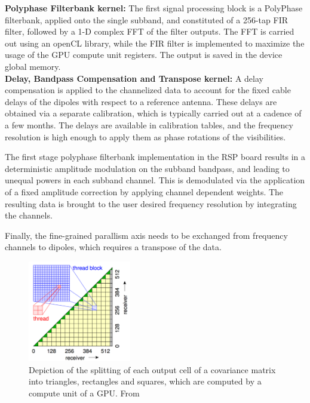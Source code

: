 \documentclass{ws-jai}
\begin{document}

\noindent  \textbf {Polyphase  Filterbank kernel:}  The first  signal processing
block  is  a  PolyPhase  filterbank,   applied  onto  the  single  subband,  and
constituted  of a  256-tap FIR  filter, followed  by a  1-D complex  FFT of  the
filter outputs.  The FFT is carried  out using an openCL  library, while the
FIR  filter  is implemented  to  maximize  the usage  of  the  GPU compute  unit
registers. The output is saved in the device global memory.\\

\noindent \textbf {Delay,  Bandpass Compensation and Transpose  kernel:} A delay
compensation is applied  to the channelized data to account  for the fixed cable
delays of  the dipoles with  respect to a  reference antenna.  These  delays are
obtained via a separate calibration, which is typically carried out at a cadence
of  a few  months.  The  delays  are available  in calibration  tables, and  the
frequency resolution  is high  enough to  apply them as  phase rotations  of the
visibilities.

The first stage polyphase filterbank implementation  in the RSP board results in
a deterministic  amplitude modulation  on the subband  bandpass, and  leading to
unequal powers in each subband channel.  This is demodulated via the application
of  a fixed  amplitude correction  by  applying channel  dependent weights.  The
resulting  data  is  brought  to   the  user  desired  frequency  resolution  by
integrating the channels.

Finally, the  fine-grained parallism axis  needs to be exchanged  from frequency
channels to dipoles, which requires a transpose of the data.

\begin{figure}[htbp]
\centering
\includegraphics[width=0.4\textwidth]{Figs/ACM_spatial_split.png}
\caption {Depiction of the splitting of each output cell of a covariance matrix into triangles, rectangles and squares, which are computed by a compute unit of a GPU. From \cite{romein2016comparison}}
\label{fig:acm_spatial_split}
\end{figure}
\end{document}

